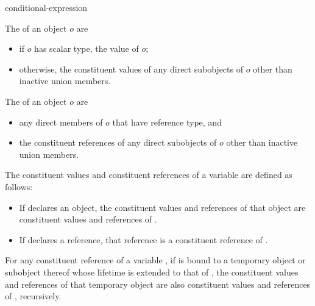 \begin{bnf}
\br
    conditional-expression
\end{bnf}

\pnum
The  of an object $o$ are
\begin{itemize}
\item
if $o$ has scalar type, the value of $o$;
\item
otherwise, the constituent values of any direct subobjects of $o$
other than inactive union members.
\end{itemize}
The  of an object $o$ are
\begin{itemize}
\item
any direct members of $o$ that have reference type, and
\item
the constituent references of any direct subobjects of $o$
other than inactive union members.
\end{itemize}

\pnum
The constituent values and constituent references of
a variable  are defined as follows:
\begin{itemize}
\item
If  declares an object,
the constituent values and references of that object are
constituent values and references of .
\item
If  declares a reference,
that reference is a constituent reference of .
\end{itemize}
For any constituent reference  of a variable ,
if  is bound to a temporary object or subobject thereof
whose lifetime is extended to that of ,
the constituent values and references of that temporary object
are also constituent values and references of , recursively.

